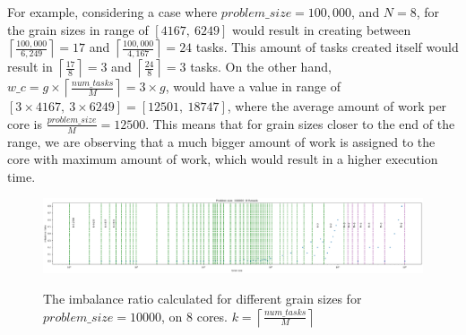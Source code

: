 \vspace{\baselineskip}
For example, considering a case where $problem\_{size}=100,000$, and $N=8$, for the grain sizes in range of $[4167,\:6249]$ would result in creating between $\left \lceil{\frac{100,000}{6,249}}\right \rceil=17$ and  $\left \lceil{\frac{100,000}{4,167}}\right \rceil=24$ tasks. This amount of tasks created itself would result in $\left \lceil{\frac{17}{8}}\right \rceil=3$ and  $\left \lceil{\frac{24}{8}}\right \rceil=3$ tasks.
On the other hand, $w\_c=g\times{\left \lceil{\frac{num\_{tasks}}{M}}\right \rceil}=3\times{g}$, would have a value in range of $[3\times4167,\:3\times6249]=[12501,\: 18747]$, where the average amount of work per core is $\frac{problem\_{size}}{M}=12500$. This means that for grain sizes closer to the end of the range, we are observing that a much bigger amount of work is assigned to the core with maximum amount of work, which would result in a higher execution time. 



\vspace{\baselineskip}	
\begin{figure}[H]
	\centering
	{\includegraphics[scale=.25]{images/hpx_for_loop/w_c.png}}
	\caption{The imbalance ratio calculated for different grain sizes for $problem\_size=10000$, on 8 cores. $k=\left\lceil{\frac{num\_{tasks}}{M}}\right \rceil$}\label{fig38}		
\end{figure}




